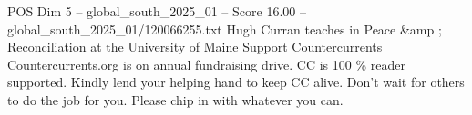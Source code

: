 \begin{textsample}{POS Dim 5 – global\_south\_2025\_01 – Score 16.00 – global\_south\_2025\_01/120066255.txt}
Hugh Curran teaches in Peace \&amp ; Reconciliation at the University of Maine Support Countercurrents Countercurrents.org is on annual fundraising drive.
CC is 100 \% reader supported.
Kindly lend your helping hand to keep CC alive.
Don't wait for others to do the job for you.
Please chip in with whatever you can.

\end{textsample}
